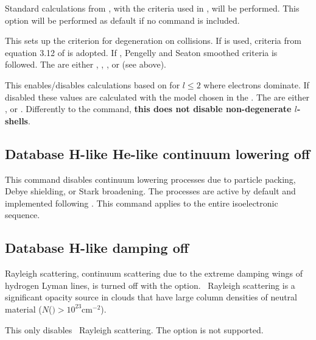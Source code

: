  Standard calculations from \citep{Badnell2021}, with the criteria used in \citet{Guzman.II.2017}, 
 will be performed. This option will be performed as default if no command is included.
 
This sets up the criterion for degeneration on collisions. If  is used, 
criteria from equation 3.12 of \citet{1972MNRAS.157..211B} is adopted. 
If , Pengelly and Seaton \cite{PengellySeaton1964} smoothed 
criteria is followed. The  are either , 
, , or  (see above).

This enables/disables calculations based on \citet{Seaton1962} for $l\leq 2$ where electrons dominate. 
If disabled these values are calculated with the model chosen in the . 
The  are either ,  or . 
Differently to the  command, {\bf this does not disable non-degenerate $l$-shells}.

\subsection{Database H-like \OR{} He-like  continuum lowering off }
This command disables continuum lowering processes due to particle packing,
Debye shielding, or Stark broadening.  The processes are active by default
and implemented following \citet{Bautista00}.  This command applies
to the entire isoelectronic sequence.

\subsection{Database H-like damping off}

Rayleigh scattering, continuum scattering due to the extreme damping
wings of hydrogen Lyman lines, is turned off with the  option.
\hi\  Rayleigh scattering is a significant opacity source in clouds that have
large column densities of neutral material
($N$(\hO $) > 10^{23} \mathrm{cm}^{-2}$).

This only disables \hi\ Rayleigh scattering.  
The  option is not supported. 

